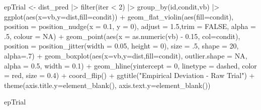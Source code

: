 \documentclass[
  letterpaper,
  DIV=11,
  numbers=noendperiod]{scrartcl}
\newenvironment{Shaded}{\begin{snugshade}}{\end{snugshade}}
\newcommand{\AttributeTok}[1]{\textcolor[rgb]{0.40,0.45,0.13}{#1}}
\newcommand{\ConstantTok}[1]{\textcolor[rgb]{0.56,0.35,0.01}{#1}}
\newcommand{\DecValTok}[1]{\textcolor[rgb]{0.68,0.00,0.00}{#1}}
\newcommand{\FloatTok}[1]{\textcolor[rgb]{0.68,0.00,0.00}{#1}}
\newcommand{\FunctionTok}[1]{\textcolor[rgb]{0.28,0.35,0.67}{#1}}
\newcommand{\NormalTok}[1]{\textcolor[rgb]{0.00,0.23,0.31}{#1}}
\newcommand{\OtherTok}[1]{\textcolor[rgb]{0.00,0.23,0.31}{#1}}
\newcommand{\SpecialCharTok}[1]{\textcolor[rgb]{0.37,0.37,0.37}{#1}}
\newcommand{\StringTok}[1]{\textcolor[rgb]{0.13,0.47,0.30}{#1}}
\begin{document}
\begin{Shaded}
\begin{Highlighting}[]
\NormalTok{epTrial }\OtherTok{\textless{}{-}}\NormalTok{ dist\_pred  }\SpecialCharTok{|\textgreater{}}
  \FunctionTok{filter}\NormalTok{(iter }\SpecialCharTok{\textless{}} \DecValTok{2}\NormalTok{)  }\SpecialCharTok{|\textgreater{}} \FunctionTok{group\_by}\NormalTok{(id,condit,vb) }\SpecialCharTok{|\textgreater{}}
  \FunctionTok{ggplot}\NormalTok{(}\FunctionTok{aes}\NormalTok{(}\AttributeTok{x=}\NormalTok{vb,}\AttributeTok{y=}\NormalTok{dist,}\AttributeTok{fill=}\NormalTok{condit)) }\SpecialCharTok{+} 
  \FunctionTok{geom\_flat\_violin}\NormalTok{(}\FunctionTok{aes}\NormalTok{(}\AttributeTok{fill=}\NormalTok{condit), }\AttributeTok{position =} \FunctionTok{position\_nudge}\NormalTok{(}\AttributeTok{x =} \FloatTok{0.1}\NormalTok{, }\AttributeTok{y =} \DecValTok{0}\NormalTok{),}
                   \AttributeTok{adjust =} \FloatTok{1.5}\NormalTok{,}\AttributeTok{trim =} \ConstantTok{FALSE}\NormalTok{, }\AttributeTok{alpha =}\NormalTok{ .}\DecValTok{5}\NormalTok{, }\AttributeTok{colour =} \ConstantTok{NA}\NormalTok{) }\SpecialCharTok{+}
  \FunctionTok{geom\_point}\NormalTok{(}\FunctionTok{aes}\NormalTok{(}\AttributeTok{x =} \FunctionTok{as.numeric}\NormalTok{(vb) }\SpecialCharTok{{-}} \FloatTok{0.15}\NormalTok{, }\AttributeTok{col=}\NormalTok{condit),}
             \AttributeTok{position =} \FunctionTok{position\_jitter}\NormalTok{(}\AttributeTok{width =} \FloatTok{0.05}\NormalTok{, }\AttributeTok{height =} \DecValTok{0}\NormalTok{),}
             \AttributeTok{size =}\NormalTok{ .}\DecValTok{5}\NormalTok{, }\AttributeTok{shape =} \DecValTok{20}\NormalTok{, }\AttributeTok{alpha=}\NormalTok{.}\DecValTok{7}\NormalTok{) }\SpecialCharTok{+}
  \FunctionTok{geom\_boxplot}\NormalTok{(}\FunctionTok{aes}\NormalTok{(}\AttributeTok{x=}\NormalTok{vb,}\AttributeTok{y=}\NormalTok{dist,}\AttributeTok{fill=}\NormalTok{condit),}
               \AttributeTok{outlier.shape =} \ConstantTok{NA}\NormalTok{,}
               \AttributeTok{alpha =} \FloatTok{0.5}\NormalTok{, }\AttributeTok{width =} \FloatTok{0.1}\NormalTok{) }\SpecialCharTok{+}
  \FunctionTok{geom\_hline}\NormalTok{(}\AttributeTok{yintercept =} \DecValTok{0}\NormalTok{,}
             \AttributeTok{linetype =} \StringTok{\textquotesingle{}dashed\textquotesingle{}}\NormalTok{,}
             \AttributeTok{color =} \StringTok{\textquotesingle{}red\textquotesingle{}}\NormalTok{,}
             \AttributeTok{size =} \FloatTok{0.4}\NormalTok{) }\SpecialCharTok{+} 
  \FunctionTok{coord\_flip}\NormalTok{() }\SpecialCharTok{+} \FunctionTok{ggtitle}\NormalTok{(}\StringTok{"Empirical Deviation {-} Raw Trial"}\NormalTok{) }\SpecialCharTok{+}
   \FunctionTok{theme}\NormalTok{(}\AttributeTok{axis.title.y=}\FunctionTok{element\_blank}\NormalTok{(),}
        \AttributeTok{axis.text.y=}\FunctionTok{element\_blank}\NormalTok{())}

\NormalTok{epTrial}
\end{Highlighting}
\end{Shaded}
\end{document}
